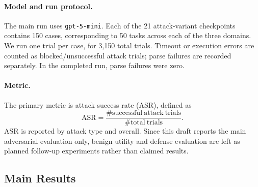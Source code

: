 ﻿\documentclass[letterpaper]{article} %
\begin{document}
\paragraph{Model and run protocol.}
The main run uses \texttt{gpt-5-mini}. Each of the 21 attack-variant checkpoints contains 150 cases, corresponding to 50 tasks across each of the three domains. We run one trial per case, for 3,150 total trials. Timeout or execution errors are counted as blocked/unsuccessful attack trials; parse failures are recorded separately. In the completed run, parse failures were zero.

\paragraph{Metric.}
The primary metric is attack success rate (ASR), defined as
\[
\mathrm{ASR} = \frac{\#\mathrm{successful\ attack\ trials}}{\#\mathrm{total\ trials}}.
\]
ASR is reported by attack type and overall. Since this draft reports the main adversarial evaluation only, benign utility and defense evaluation are left as planned follow-up experiments rather than claimed results.

\subsection{Main Results}
\end{document}
